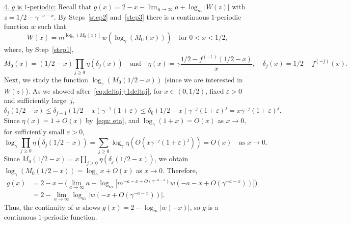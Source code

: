 \documentclass[11pt]{article}
\numberwithin{theorem}{section}
\begin{document}
\medskip
\noindent
\underline{4. $g$ is $1$-periodic:} 
Recall that $g(x) = 2-x-\lim_{a\to\infty}a+\log_m\left|W(z) \right|$ with $z=1/2 -\gamma^{-a-x}$. By Steps~\ref{step2} and~\ref{step3} there is a continuous $1$-periodic function $w$ such that  
\[
    W(x)=m^{\log_{\gamma}(M_0(x))} w(\log_\gamma(M_0(x)))
\quad\text{for } 0<x<1/2,
\]
where, by Step~\ref{step1},
\[
    M_0(x)=(1/2-x)\prod_{j\geq 0} \eta(\delta_j(x)) 
    \quad\text{and}\quad 
    \eta(x)=\gamma\frac{1/2-f^{(-1)}(1/2-x)}{x},
    \quad
    \delta_j(x)=1/2-f^{(-j)}(x).
\]
Next, we study the function $\log_\gamma(M_0(1/2-x))$ (since we are interested in $W(z)$). 
As we showed after~\eqref{eq:deltaj+1deltaj}, for $x\in(0,1/2)$, fixed $\varepsilon>0$ and sufficiently large~$j$, 
\[
    \delta_{j}(1/2-x)\leq \delta_{j-1}(1/2-x)\gamma^{-1}(1+\varepsilon)\leq \delta_0(1/2-x)\gamma^{-j}(1+\varepsilon)^j = x\gamma^{-j}(1+\varepsilon)^j.
\]
Since $\eta(x)=1+O(x)$ by~\eqref{equ: eta}, and $\log_\gamma(1+x)=O(x)$ as $x\to 0$, for sufficiently small $\varepsilon>0$,
\[
\log_\gamma \prod_{j\geq 0} \eta(\delta_j(1/2-x)) = \sum_{j\geq0}\log_\gamma \eta(O(x\gamma^{-j}(1+\varepsilon)^j)) 
= O(x)
\quad \text{as }x\to 0.
\]
Since $M_0(1/2-x)=x\prod_{j\geq 0} \eta(\delta_j(1/2-x))$, we obtain 
$\log_\gamma(M_0(1/2-x)) = \log_\gamma x + O(x)$ as $x\to 0$.
Therefore, 
\begin{align*}
    g(x) &= 2-x-\Big(\lim_{a\to\infty}a+\log_m\left|m^{-a-x+O(\gamma^{-a-x})}w(-a-x+O(\gamma^{-a-x})) \right|\Big)\\
    &=2-\lim_{a\to\infty}\log_m\left|w(-x+O(\gamma^{-a-x})) \right|.
\end{align*}
Thus, the continuity of $w$ shows $g(x) = 2-\log_m|w(-x)|$, so $g$ is a continuous $1$-periodic function. 
\end{document}
